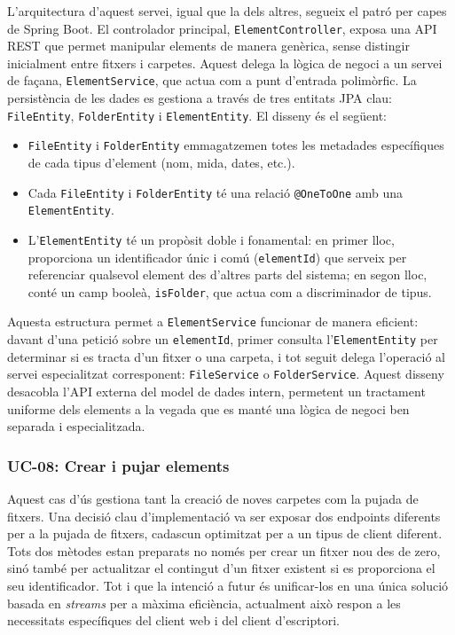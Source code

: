 L'arquitectura d'aquest servei, igual que la dels altres, segueix el patró per capes de Spring Boot. El controlador principal, \texttt{ElementController}, exposa una API REST que permet manipular elements de manera genèrica, sense distingir inicialment entre fitxers i carpetes. Aquest delega la lògica de negoci a un servei de façana, \texttt{ElementService}, que actua com a punt d'entrada polimòrfic. La persistència de les dades es gestiona a través de tres entitats JPA clau: \texttt{FileEntity}, \texttt{FolderEntity} i \texttt{ElementEntity}. El disseny és el següent:
\begin{itemize}
    \item \texttt{FileEntity} i \texttt{FolderEntity} emmagatzemen totes les metadades específiques de cada tipus d'element (nom, mida, dates, etc.).
    \item Cada \texttt{FileEntity} i \texttt{FolderEntity} té una relació \texttt{@OneToOne} amb una \texttt{ElementEntity}.
    \item L'\texttt{ElementEntity} té un propòsit doble i fonamental: en primer lloc, proporciona un identificador únic i comú (\texttt{elementId}) que serveix per referenciar qualsevol element des d'altres parts del sistema; en segon lloc, conté un camp booleà, \texttt{isFolder}, que actua com a discriminador de tipus.
\end{itemize}
Aquesta estructura permet a \texttt{ElementService} funcionar de manera eficient: davant d'una petició sobre un \texttt{elementId}, primer consulta l'\texttt{ElementEntity} per determinar si es tracta d'un fitxer o una carpeta, i tot seguit delega l'operació al servei especialitzat corresponent: \texttt{FileService} o \texttt{FolderService}. Aquest disseny desacobla l'API externa del model de dades intern, permetent un tractament uniforme dels elements a la vegada que es manté una lògica de negoci ben separada i especialitzada.

\subsubsection{UC-08: Crear i pujar elements}

Aquest cas d'ús gestiona tant la creació de noves carpetes com la pujada de fitxers. Una decisió clau d'implementació va ser exposar dos endpoints diferents per a la pujada de fitxers, cadascun optimitzat per a un tipus de client diferent. Tots dos mètodes estan preparats no només per crear un fitxer nou des de zero, sinó també per actualitzar el contingut d'un fitxer existent si es proporciona el seu identificador. Tot i que la intenció a futur és unificar-los en una única solució basada en \textit{streams} per a màxima eficiència, actualment això respon a les necessitats específiques del client web i del client d'escriptori.

